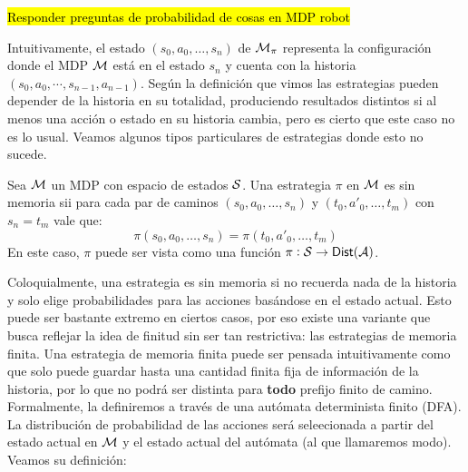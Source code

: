 \hl{Responder preguntas de probabilidad de cosas en MDP robot}

Intuitivamente, el estado $(s_0, a_0, \dots, s_n)$ de $\mathcal{M}_\pi$ representa la
configuración donde el MDP $\mathcal{M}$ está en el estado $s_n$ y cuenta con la
historia $(s_0, a_0, \cdots, s_{n-1}, a_{n-1})$. Según la definición que vimos
las estrategias pueden depender de la historia en su totalidad, produciendo
resultados distintos si al menos una acción o estado en su historia cambia,
pero es cierto que este caso no es lo usual. Veamos algunos tipos particulares
de estrategias donde esto no sucede.

\begin{definition}
	Sea $\mathcal{M}$ un MDP con espacio de estados $\mathcal{S}$. Una estrategia $\pi$ en $\mathcal{M}$ es sin memoria sii para cada par de caminos $(s_0, a_0, \dots, s_n)$ y $(t_0, a'_0, \dots, t_m)$ con $s_n = t_m$ vale que:
	$$\pi(s_0, a_0, \dots, s_n) = \pi(t_0, a'_0, \dots, t_m)$$
	En este caso, $\pi$ puede ser vista como una función $\pi : \mathcal{S} \rightarrow \mathsf{Dist}(\mathcal{A})$.
\end{definition}

Coloquialmente, una estrategia es sin memoria si no recuerda nada de la
historia y solo elige probabilidades para las acciones basándose en el estado
actual. Esto puede ser bastante extremo en ciertos casos, por eso existe una
variante que busca reflejar la idea de finitud sin ser tan restrictiva: las
estrategias de memoria finita. Una estrategia de memoria finita puede ser
pensada intuitivamente como que solo puede guardar hasta una cantidad finita
fija de información de la historia, por lo que no podrá ser distinta para
\textbf{todo} prefijo finito de camino. Formalmente, la definiremos a través de
una autómata determinista finito (DFA). La distribución de probabilidad de las
acciones será seleecionada a partir del estado actual en $\mathcal{M}$ y el estado
actual del autómata (al que llamaremos modo). Veamos su definición:

